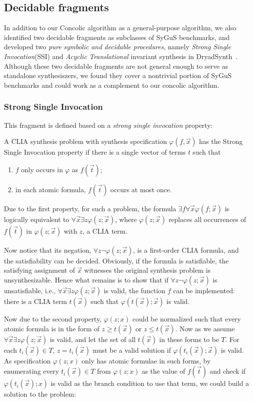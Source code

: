 \documentclass[conference]{IEEEtran}
\newcommand{\DryadSynth}{{\sc DryadSynth~}}
\newcommand{\vecx}{\vec{x}}
\newcommand{\vect}{\vec{t}}
\begin{document}
\subsection*{Decidable fragments}

In addition to our Concolic algorithm as a general-purpose algorithm, we also identified two decidable fragments as subclasses of SyGuS benchmarks, and developed two \emph{pure symbolic and decidable procedures}, namely \emph{Strong Single Invocation}(SSI) and \emph{Acyclic Translational} invariant synthesis in \DryadSynth. Although these two decidable fragments are not general enough to serve as standalone synthesiszers, we found they cover a nontrivial portion of SyGuS benchmarks and could work as a complement to our concolic algorithm.

\subsubsection*{Strong Single Invocation}
This fragment is defined based on a \emph{strong single invocation} property:

A CLIA synthesis problem with synthesis specification $\varphi(f, \vec{x})$ has the Strong Single Invocation property if there is a single vector of terms $t$ such that
\begin{enumerate}
    \item $f$ only occurs in $\varphi$ as $f(\vec{t})$;
    \item in each atomic formula, $f(\vec{t})$ occurs at most once.
\end{enumerate}

Due to the first property, for such a problem, the formula $\exists f \forall \vecx \varphi (f; \vecx)$ is logically equivalent to $\forall \vecx \exists z \varphi (z; \vecx)$, where $\varphi(z; \vecx)$ replaces all occurrences of $f(\vect)$ in $\varphi (z; \vecx)$ with $z$, a CLIA term.

Now notice that its negation, $\forall z \neg \varphi(z; \vecx)$, is a first-order CLIA formula, and the satisfiability can be decided. Obviously, if the formula is satisfiable, the satisfying assignment of $\vecx$ witnesses the original synthesis problem is unsynthesizable. Hence what remains is to show that if $\forall z \neg \varphi(z; \vecx)$ is unsatisfiable, i.e., $\forall \vecx \exists z \varphi(z; \vecx)$ is valid, the function $f$ can be implemented: there is a CLIA term $t(\vecx)$ such that $\varphi(t(\vecx); \vecx)$ is valid.

Now due to the second property, $\varphi(z;x)$ could be normalized such that every atomic formula is in the form of $z\ge t(\vecx)$ or $z\le t(\vecx)$. Now as we assume $\forall \vecx \exists z \varphi(z; \vecx)$  is valid, and let the set of all $t(\vecx)$ in these forms to be $T$. For each $t_i(\vecx) \in T$, $z = t_i(\vecx)$ must be a valid solution if $\varphi(t_i(\vecx); \vecx)$ is valid. As specification $\varphi(z;x)$ only has atomic formulae in such forms, by enumerating every $t_i(\vecx) \in T$ from $\varphi(z;x)$ as the value of $f(\vect)$ and check if $\varphi(t_i(\vecx);x)$ is valid as the branch condition to use that term, we could build a solution to the problem:
\end{document}

